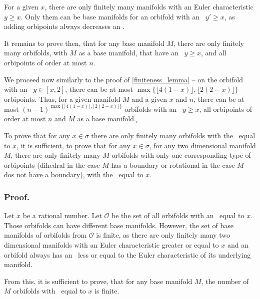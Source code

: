 For a given $x$, there are only finitely many manifolds 
with an Euler characteristic $y \geq x$. Only them can be 
base manifolds for an orbifold with an \Eoc\ $y'\geq x$, as adding orbipoints always 
decreases an \Eoc. 

It remains to prove then, that for any base manifold $M$, there are only finitely many orbifolds, 
with $M$ as a base manifold, that have 
 an \Eoc\ $y \geq x$, and all orbipoints of order at most $n$.

We proceed now similarly to the proof of \ref{finiteness_lemma} -- 
on the orbifold with an \Eoc\ $y \in [x,2]$, there can be at most 
$\max \{\lfloor 4(1-x) \rfloor, \lfloor 2(2-x) \rfloor\}$ orbipoints. 
Thus, for a given manifold $M$ and a given $x$ and $n$, there can be at most 
$(n-1)^{\max \{\lfloor 4(1-x) \rfloor, \lfloor 2(2-x) \rfloor\}}$ orbifolds with an \Eoc\ 
$y \geq x$, 
all orbipoints of order at most $n$ and $M$ as a base manifold.$_\square$ 

\begin{observation}\label{simplification of the finiteness theorem}
To prove that for any $x \in \sigma$ there are only finitely many orbifolds 
with the \Eoc\ equal to $x$, it is sufficient, to prove that 
for any $x \in \sigma$, for any two dimensional manifold $M$, there are only 
finitely many $M$-orbifolds with only one corresponding type of orbipoints (dihedral in the case 
$M$ has a boundary or rotational in the case $M$ dos not have a boundary), 
with the \Eoc\ equal to $x$.
\end{observation}
\subsubsection{Proof.}
Let $x$ be a rational number. 
Let $\mathcal{O}$ be the set of all orbifolds with 
an \Eoc\ equal to $x$. 
Those orbifolds can have different base manifolds. However, the set of base manifolds of 
orbifolds from $\mathcal{O}$ is finite, as there are only finitely many 
two dimensional manifolds with an Euler characteristic greater or equal to $x$ and an 
orbifold always has 
an \Eoc\ less or equal to the Euler characteristic of its underlying manifold. 

From this, it is sufficient to prove, that for any base manifold $M$, 
the number of $M$ orbifolds 
with \Eoc\ equal to $x$ is finite.

